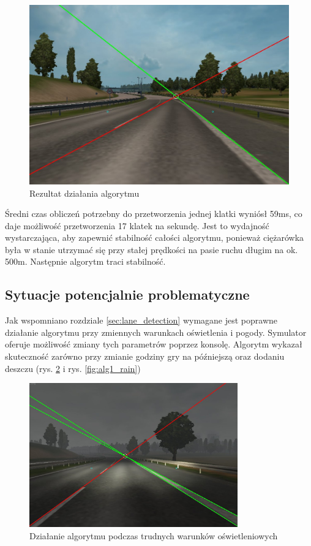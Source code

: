 \begin{figure}
  \centering
  \includegraphics[width=13cm]{img/alg1_res.jpg}
  \caption{Rezultat działania algorytmu}
  \label{fig:alg1_res}
\end{figure}

Średni czas obliczeń potrzebny do przetworzenia jednej klatki wyniósł 59ms, co daje możliwość przetworzenia 17 klatek na sekundę. 
Jest to wydajność wystarczająca, aby zapewnić stabilność całości algorytmu, ponieważ ciężarówka była w stanie utrzymać się przy stałej prędkości na pasie ruchu długim na ok. 500m. 
Następnie algorytm traci stabilność.

\subsection{Sytuacje potencjalnie problematyczne}

Jak wspomniano rozdziale \ref{sec:lane_detection} wymagane jest poprawne działanie algorytmu przy zmiennych warunkach oświetlenia i pogody. 
Symulator oferuje możliwość zmiany tych parametrów poprzez konsolę. 
Algorytm wykazał skuteczność zarówno przy zmianie godziny gry na późniejszą oraz dodaniu deszczu (rys. \ref{fig:alg1_late} i rys. \ref{fig:alg1_rain})

\begin{figure}
  \centering
  \includegraphics[width=9cm]{img/alg1_late.jpg}
  \caption{Działanie algorytmu podczas trudnych warunków oświetleniowych}
  \label{fig:alg1_late}
\end{figure}

